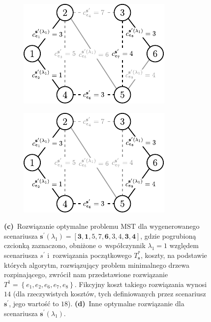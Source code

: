 \begin{figure}[!htbp]
	\ContinuedFloat
	\null\hfill
	\begin{subfigure}[b]{0.32\textwidth}
		\includegraphics[width=\textwidth]{Chapter_IV/INC-MST-example/c1}
		\caption{}
		\label{fig:imstExample:c}
	\end{subfigure}
	\hfill
	\begin{subfigure}[b]{0.32\textwidth}
		\includegraphics[width=\textwidth]{Chapter_IV/INC-MST-example/c2}
		\caption{}
		\label{fig:imstExample:d}
	\end{subfigure}
	\hfill\null
	\caption{
		\textbf{(c)}~Rozwiązanie optymalne problemu \textsc{MST} dla wygenerowanego scenariusza $\textbf{s}^{\prime} \left( \lambda_{1} \right) = \left[ \textbf{3}, \textbf{1}, 5, 7, \textbf{6}, 3, 4, \textbf{3}, \textbf{4} \right]$, gdzie pogrubioną czcionką zaznaczono, obniżone o~współczynnik $\lambda_{1} = 1$ względem scenariusza $s^{\prime}$ i~rozwiązania początkowego $T^{\ast}_{\textbf{s}}$, koszty, na podstawie których algorytm, rozwiązujący problem minimalnego drzewa rozpinającego, zwrócił nam przedstawione rozwiązanie $T^{1} = \left\{ e_{1}, e_{2}, e_{6}, e_{7}, e_{8} \right\}$.
		Fikcyjny koszt takiego rozwiązania wynosi $14$ (dla rzeczywistych kosztów, tych definiowanych przez scenariusz $\textbf{s}^{\prime}$, jego wartość to $18$).
		\textbf{(d)}~Inne optymalne rozwiązanie dla scenariusza $\textbf{s}^{\prime} \left( \lambda_{1} \right)$.
	}
\end{figure}

